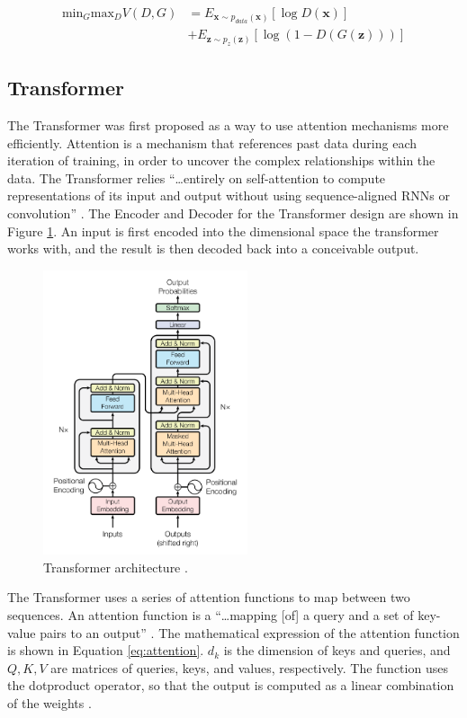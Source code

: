 \documentclass[letterpaper]{article} %
\begin{document}
\begin{equation}
\label{eq:gan_basic}
\begin{split}
\text{min}_G\text{max}_DV(D,G) &=
E_{\mathbf{x}\sim p_{data}(\mathbf{x})}[\log D(\mathbf{x})] \\
&+ E_{\mathbf{z}\sim p_{z}(\mathbf{z})}[\log(1 - D(G(\mathbf{z})))]
\end{split}
\end{equation}

\subsection{Transformer}
The Transformer was first proposed
as a way to use attention mechanisms more efficiently.
Attention is a mechanism that references past data during each iteration of training,
in order to uncover the complex relationships within the data.
The Transformer relies
``\dots entirely on self-attention to compute representations of its input and output
without using sequence-aligned RNNs or convolution''
\cite{attention_need}.
The Encoder and Decoder for the Transformer design
are shown in Figure \ref{fig:attention}.
An input is first encoded into the dimensional space
the transformer works with,
and the result is then decoded back into a conceivable output.

\begin{figure}[htbp]
\centerline{\includegraphics[width=6cm]{attention_architecture.png}}
\caption{Transformer architecture
\cite{attention_need}.}
\label{fig:attention}
\end{figure}

The Transformer uses a series of attention functions to map
between two sequences.
An attention function is a
``\dots mapping [of] a query and a
set of key-value pairs to an output''
\cite{attention_need}.
The mathematical expression of the attention function is shown in
Equation \ref{eq:attention}.
$d_k$ is the dimension of keys and queries, and
$Q,K,V$ are matrices of queries, keys, and values, respectively.
The function uses the dotproduct operator, so that the output is computed as
a linear combination of the weights
\cite{attention_need}.
\end{document}
